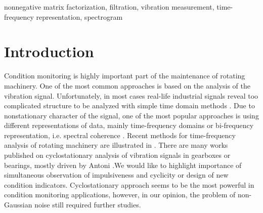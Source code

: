 \documentclass[preprint,12pt]{elsarticle}
\newcommand\blfootnote[1]{%
  \begingroup
  \renewcommand\thefootnote{}\footnote{#1}%
  \addtocounter{footnote}{-1}%
  \endgroup
}
\begin{document}
\begin{frontmatter}
\begin{keyword}
nonnegative matrix factorization, filtration, vibration measurement, time-frequency representation, spectrogram
\end{keyword}

\end{frontmatter}

\linenumbers
\section{Introduction}

Condition monitoring is highly important part of the maintenance of rotating machinery. One of the most common approaches is based on the analysis of the vibration signal. Unfortunately, in most cases real-life industrial signals reveal too complicated structure to be analyzed with simple time domain methods \cite{randall2011rolling}. Due to nonstationary character of the signal, one of the most popular approaches is using different representations of data, mainly time-frequency domains or bi-frequency representation, i.e. spectral coherence \cite{randall2011rolling}. Recent methods for time-frequency analysis of rotating machinery are illustrated in \cite{feng2013recent}. 
There are many works published on cyclostationary analysis of vibration signals in gearboxes or bearings, mostly driven by Antoni \cite{Borghesani2017,antoni2016info,antoni2019, abboud2019}.We would like to highlight importance of simultaneous observation of impulsiveness and cyclicity or design of new condition indicators. Cyclostationary approach seems to be the most powerful in condition monitoring applications, however, in our opinion, the problem of non-Gaussian noise still required further studies.
\end{document}
